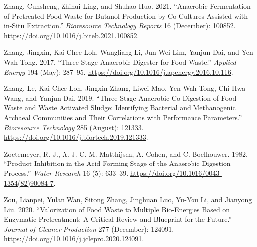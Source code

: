 \documentclass[11pt]{report}
\begin{document}
\begin{hangparas}{1.5em}{1}
\hypertarget{citeproc_bib_item_53}{Zhang, Cunsheng, Zhihui Ling, and Shuhao Huo. 2021. “Anaerobic Fermentation of Pretreated Food Waste for Butanol Production by Co-Cultures Assisted with in-Situ Extraction.” \textit{Bioresource Technology Reports} 16 (December): 100852. \url{https://doi.org/10.1016/j.biteb.2021.100852}.}

\hypertarget{citeproc_bib_item_54}{Zhang, Jingxin, Kai-Chee Loh, Wangliang Li, Jun Wei Lim, Yanjun Dai, and Yen Wah Tong. 2017. “Three-Stage Anaerobic Digester for Food Waste.” \textit{Applied Energy} 194 (May): 287–95. \url{https://doi.org/10.1016/j.apenergy.2016.10.116}.}

\hypertarget{citeproc_bib_item_55}{Zhang, Le, Kai-Chee Loh, Jingxin Zhang, Liwei Mao, Yen Wah Tong, Chi-Hwa Wang, and Yanjun Dai. 2019. “Three-Stage Anaerobic Co-Digestion of Food Waste and Waste Activated Sludge: Identifying Bacterial and Methanogenic Archaeal Communities and Their Correlations with Performance Parameters.” \textit{Bioresource Technology} 285 (August): 121333. \url{https://doi.org/10.1016/j.biortech.2019.121333}.}

\hypertarget{citeproc_bib_item_56}{Zoetemeyer, R. J., A. J. C. M. Matthijsen, A. Cohen, and C. Boelhouwer. 1982. “Product Inhibition in the Acid Forming Stage of the Anaerobic Digestion Process.” \textit{Water Research} 16 (5): 633–39. \url{https://doi.org/10.1016/0043-1354(82)90084-7}.}

\hypertarget{citeproc_bib_item_57}{Zou, Lianpei, Yulan Wan, Sitong Zhang, Jinghuan Luo, Yu-You Li, and Jianyong Liu. 2020. “Valorization of Food Waste to Multiple Bio-Energies Based on Enzymatic Pretreatment: A Critical Review and Blueprint for the Future.” \textit{Journal of Cleaner Production} 277 (December): 124091. \url{https://doi.org/10.1016/j.jclepro.2020.124091}.}\bigskip
\end{hangparas}
\end{document}
